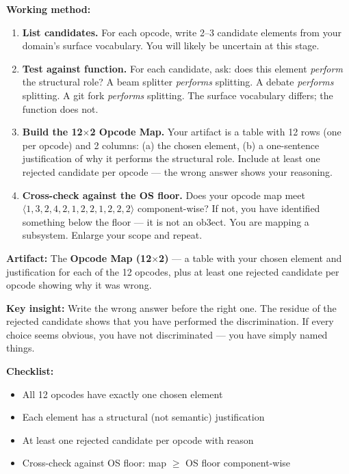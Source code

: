 \documentclass[12pt,a4paper]{article}
\begin{document}
{\bf Working method:}
\begin{enumerate}[label=\textbf{1.\arabic*.}, leftmargin=2em]
\item \textbf{List candidates.} For each opcode, write 2--3 candidate elements from
    your domain's surface vocabulary. You will likely be uncertain at this stage.

\item \textbf{Test against function.} For each candidate, ask: does this element \emph{perform}
    the structural role? A beam splitter \emph{performs} splitting. A debate \emph{performs}
    splitting. A git fork \emph{performs} splitting. The surface vocabulary differs; the
    function does not.

\item \textbf{Build the 12$\times$2 Opcode Map.} Your artifact is a table with 12 rows
    (one per opcode) and 2 columns: (a) the chosen element, (b) a one-sentence
    justification of why it performs the structural role. Include at least one rejected
    candidate per opcode — the wrong answer shows your reasoning.

\item \textbf{Cross-check against the OS floor.} Does your opcode map meet
    $\langle 1,3,2,4,2,1,2,2,1,2,2,2 \rangle$ component-wise? If not, you have identified
    something below the floor — it is not an ob3ect. You are mapping a subsystem.
    Enlarge your scope and repeat.
\end{enumerate}

{\bf Artifact:} The \textbf{Opcode Map (12$\times$2)} — a table with your chosen element
and justification for each of the 12 opcodes, plus at least one rejected candidate per
opcode showing why it was wrong.

{\bf Key insight:} Write the wrong answer before the right one. The residue of the
rejected candidate shows that you have performed the discrimination. If every choice
seems obvious, you have not discriminated — you have simply named things.

{\bf Checklist:}
\begin{itemize}
\item[ ] All 12 opcodes have exactly one chosen element
\item[ ] Each element has a structural (not semantic) justification
\item[ ] At least one rejected candidate per opcode with reason
\item[ ] Cross-check against OS floor: map $\geq$ OS floor component-wise
\end{itemize}
\end{document}
